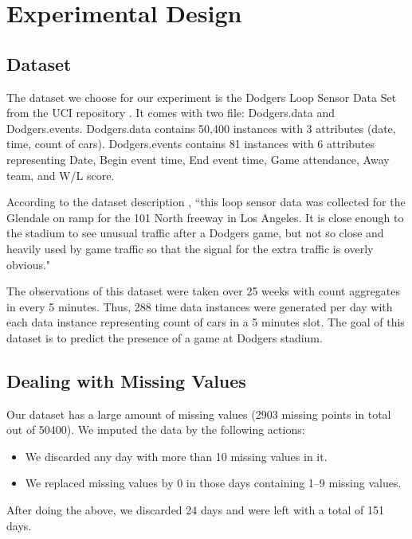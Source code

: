 \documentclass[conference]{IEEEtran}
\begin{document}
		
		
		
		\section{Experimental Design}
		\label{sec:experimental-design}
		\subsection{Dataset}
		The dataset we choose for our experiment is the Dodgers Loop Sensor Data Set from the UCI repository \cite{dataset}. It comes with two file: Dodgers.data and Dodgers.events. Dodgers.data contains 50,400 instances with 3 attributes (date, time, count of cars). Dodgers.events contains 81 instances with 6 attributes representing  Date, Begin event time, End event time, Game attendance, Away team, and W/L score. 
		
		According to the dataset description \cite{dataset}, ``this loop sensor data was collected for the Glendale on ramp for the 101 North freeway in Los Angeles. It is close enough to the stadium to see unusual traffic after a Dodgers game, but not so close and heavily used by game traffic so that the signal for the extra traffic is overly obvious." 
		
		The observations of this dataset were taken over 25 weeks with count aggregates in every 5 minutes. Thus, 288 time data instances were generated per day with each data instance representing count of cars in a 5 minutes slot. The goal of this dataset is to predict the presence of a  game at Dodgers stadium. 
		
		\subsection{Dealing with Missing Values}
		\label{sec:missing-values}
		
		Our dataset has a large amount of missing values (2903 missing points in total out of 50400). We imputed the data by the following actions:
		\begin{itemize}
			\item We discarded any day with more than 10 missing values in it.
			\item We replaced missing values by 0 in those days containing 1--9 missing values.
		\end{itemize}
		After doing the above, we discarded 24 days and were left with a total of 151 days. 
		
\end{document}
